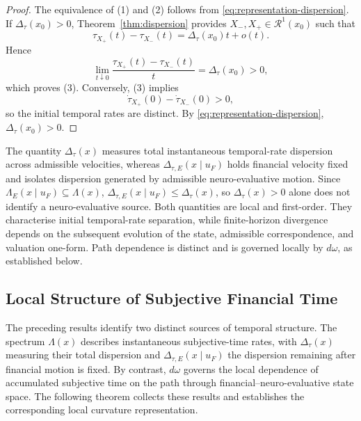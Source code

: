 \documentclass[graybox,natbib]{SNmult}
\providecommand{\1}{}
\renewcommand{\1}{\mathbbm 1}
\begin{document}
\begin{proof}

The equivalence of (1) and (2) follows from
\eqref{eq:representation-dispersion}. If
\(\Delta_\tau(x_0)>0\), Theorem~\ref{thm:dispersion} provides
\(X_-,X_+\in\mathcal R^1(x_0)\) such that
\[
\tau_{X_+}(t)-\tau_{X_-}(t)
=
\Delta_\tau(x_0)t+o(t).
\]
Hence
\[
\lim_{t\downarrow0}
\frac{\tau_{X_+}(t)-\tau_{X_-}(t)}{t}
=
\Delta_\tau(x_0)>0,
\]
which proves (3). Conversely, (3) implies
\[
\dot\tau_{X_+}(0)-\dot\tau_{X_-}(0)>0,
\]
so the initial temporal rates are distinct. By
\eqref{eq:representation-dispersion},
\(\Delta_\tau(x_0)>0\).
\end{proof}

\begin{remark}
\label{rem:temporal-dispersion-scope} The quantity \(\Delta_\tau(x)\) measures total instantaneous temporal-rate
dispersion across admissible velocities, whereas
\(\Delta_{\tau,E}(x\mid u_F)\) holds financial velocity fixed and isolates
dispersion generated by admissible neuro-evaluative motion. Since
\(\Lambda_E(x\mid u_F)\subseteq\Lambda(x)\),
\(\Delta_{\tau,E}(x\mid u_F)\leq\Delta_\tau(x)\), so
\(\Delta_\tau(x)>0\) alone does not identify a neuro-evaluative source.
Both quantities are local and first-order. They characterise initial
temporal-rate separation, while finite-horizon divergence depends on the
subsequent evolution of the state, admissible correspondence, and valuation
one-form. Path dependence is distinct and is governed locally by \(d\omega\),
as established below.
\end{remark}









\subsection{Local Structure of Subjective Financial Time}
\label{subsec:local-structure}

The preceding results identify two distinct sources of temporal structure.
The spectrum \(\Lambda(x)\) describes instantaneous subjective-time rates,
with \(\Delta_\tau(x)\) measuring their total dispersion and
\(\Delta_{\tau,E}(x\mid u_F)\) the dispersion remaining after financial motion
is fixed. By contrast, \(d\omega\) governs the local dependence of accumulated
subjective time on the path through financial--neuro-evaluative state space.
The following theorem collects these results and establishes the corresponding
local curvature representation.
\end{document}
